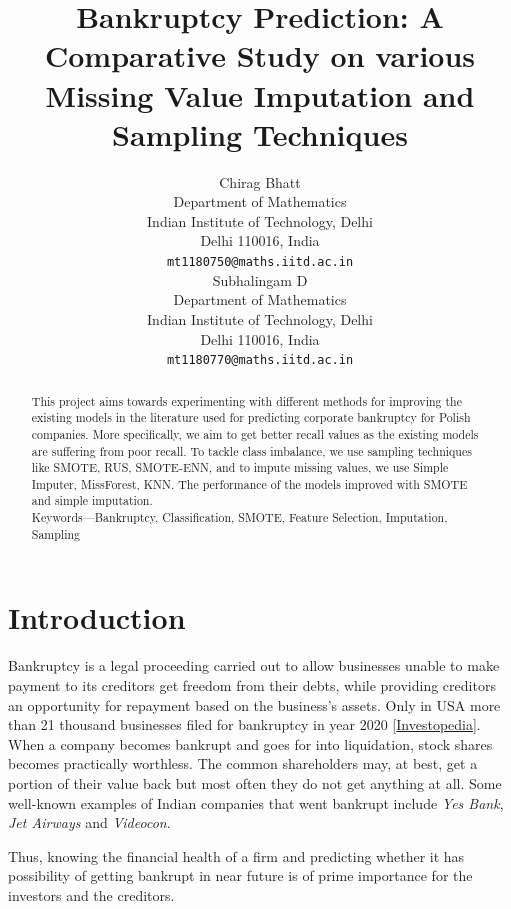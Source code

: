 \documentclass[11pt,a4paper]{article}
\title{Bankruptcy Prediction: A Comparative Study on various Missing Value Imputation and Sampling Techniques}
\author{
  Chirag Bhatt \\
  Department of Mathematics \\
  Indian Institute of Technology, Delhi \\
  Delhi 110016, India \\
  \texttt{mt1180750@maths.iitd.ac.in} \\\And
  Subhalingam D \\
  Department of Mathematics \\
  Indian Institute of Technology, Delhi \\
  Delhi 110016, India \\
  \texttt{mt1180770@maths.iitd.ac.in} \\}
\date{}
\begin{document}


\maketitle
\begin{abstract}
This project aims towards experimenting with different methods for improving the existing models in the literature used for predicting corporate bankruptcy for Polish companies. More specifically, we aim to get better recall values as the existing models are suffering from poor recall. To tackle class imbalance, we use sampling techniques like SMOTE, RUS, SMOTE-ENN, and to impute missing values, we use Simple Imputer, MissForest, KNN. The performance of the models improved with SMOTE and simple imputation.\\

Keywords—Bankruptcy, Classification, SMOTE, 
Feature Selection, Imputation, Sampling
\end{abstract}


\section{Introduction}
\label{sec::intro}
Bankruptcy is a legal proceeding carried out to allow businesses unable to make payment to its creditors get freedom from their debts, while providing creditors an opportunity for repayment based on the business's assets. Only in USA more than 21 thousand businesses filed for bankruptcy in year 2020 [\href{https://www.investopedia.com/terms/b/bankruptcy.asp}{Investopedia}].  When a company becomes bankrupt and goes for into liquidation, stock shares becomes practically worthless. The common shareholders may, at best, get a portion of their value back but most often they do not get anything at all. Some well-known examples of Indian companies that went bankrupt include \textit{Yes Bank}, \textit{Jet Airways} and \textit{Videocon}.

Thus, knowing the financial health of a firm and predicting whether it has possibility of getting bankrupt in near future is of prime importance for the investors and the creditors.

\end{document}

